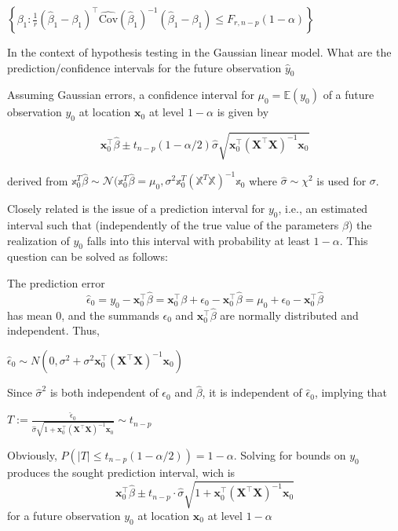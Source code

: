 \(
\left\{ \beta_1 : \frac{1}{r} (\hat{\beta}_1 - \beta_1)^\top \widehat{\text{Cov}}(\hat{\beta}_1)^{-1} (\hat{\beta}_1 - \beta_1) \leq F_{r, n - p}(1 - \alpha) \right\}
\)

In the context of hypothesis testing in the Gaussian linear model.
What are the prediction/confidence intervals for the future observation \( \hat{y}_0 \)

Assuming Gaussian errors, a confidence interval for \(\mu_0 = \mathbb{E}(y_0)\) of a future observation \(y_0\) 
at location \(\mathbf{x}_0\) at level \(1 - \alpha\) is given by

\[
\mathbf{x}_0^\top \hat{\beta} \pm t_{n - p}(1 - \alpha/2) \hat{\sigma} \sqrt{\mathbf{x}_0^\top (\mathbf{X}^\top \mathbf{X})^{-1} \mathbf{x}_0}
\]

derived from \( \mathbb{x}^T_0\hat{\mathbb{\beta}} \sim \mathcal{N}(\mathbb{x}^T_0\hat{\mathbb{\beta}} = \mu_0, \sigma^2 \mathbb{x}_0^T(\mathbb{X}^T\mathbb{X})^{-1}\mathbb{x}_0 \)
where \( \hat{\sigma} \sim \chi^2\) is used for \( \sigma \).


Closely related is the issue of a prediction interval for \( y_0 \), i.e., an estimated interval such that (independently of the true value of the parameters \(\beta\)) the realization of \( y_0 \) falls into this interval with probability at least \( 1 - \alpha \).
This question can be solved as follows:

The prediction error 
\[ \hat{\epsilon}_0 = y_0 - \mathbf{x}_0^\top \hat{\beta} = \mathbf{x}_0^\top \beta + \epsilon_0 - \mathbf{x}_0^\top \hat{\beta} = \mu_0 + \epsilon_0 - \mathbf{x}_0^\top \hat{\beta}\] 
has mean 0, and the summands \( \epsilon_0 \) and \( \mathbf{x}_0^\top \hat{\beta} \) are normally distributed and independent. Thus,

\(
\hat{\epsilon}_0 \sim N \left( 0, \sigma^2 + \sigma^2 \mathbf{x}_0^\top (\mathbf{X}^\top \mathbf{X})^{-1} \mathbf{x}_0 \right)
\)

Since \( \hat{\sigma}^2 \) is both independent of \( \epsilon_0 \) and \(\hat{\beta}\), it is independent of \( \hat{\epsilon}_0 \), implying that

\(
T := \frac{\hat{\epsilon}_0}{\hat{\sigma} \sqrt{1 + \mathbf{x}_0^\top (\mathbf{X}^\top \mathbf{X})^{-1} \mathbf{x}_0}} \sim t_{n-p}
\)

Obviously, \( P(|T| \leq t_{n-p}(1 - \alpha/2)) = 1 - \alpha \). Solving for bounds on \( y_0 \) produces the sought prediction interval,
wich is
\[
\mathbf{x}_0^\top \hat{\beta} \pm t_{n-p} \cdot \hat{\sigma} \sqrt{1 + \mathbf{x}_0^\top (\mathbf{X}^\top \mathbf{X})^{-1} \mathbf{x}_0}
\]
for a future observation \( y_0 \) at location \( \mathbf{x}_0 \) at level \( 1 - \alpha \)
